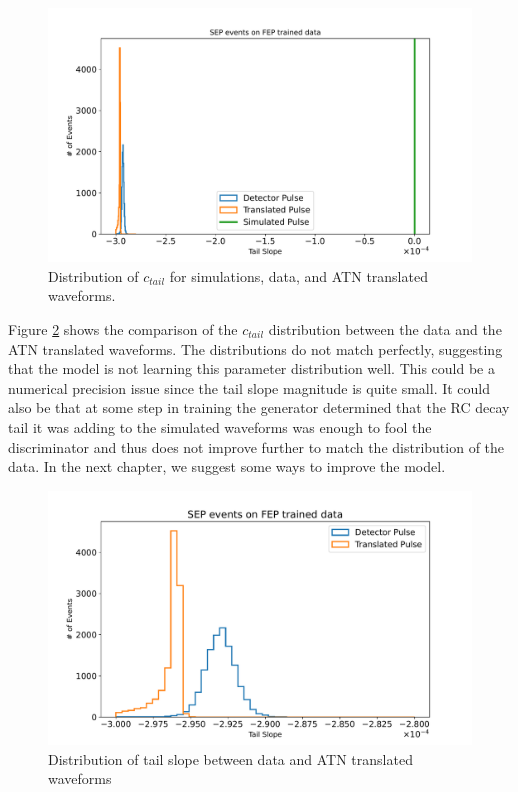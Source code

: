 \begin{figure}%
\centering
\includegraphics[width=0.9\linewidth,trim={2pc 0pc 2pc 0pc},clip]{ch8/figs/SEP_ts_with_sim.pdf}
\caption{Distribution of $c_{tail}$ for simulations, data, and ATN translated waveforms.}
\label{ch8_fig_tail_slope_comp}
\end{figure}

Figure \ref{ch8_fig_tail_slope_sim} shows the comparison of the $c_{tail}$ distribution between the data and the ATN translated waveforms. The distributions do not match perfectly, suggesting that the model is not learning this parameter distribution well. This could be a numerical precision issue since the tail slope magnitude is quite small. It could also be that at some step in training the generator determined that the RC decay tail it was adding to the simulated waveforms was enough to fool the discriminator and thus does not improve further to match the distribution of the data. In the next chapter, we suggest some ways to improve the model.

\begin{figure}%
\centering
\includegraphics[width=0.9\linewidth,trim={2pc 0pc 2pc 0pc},clip]{ch8/figs/SEP_ts.pdf}
\caption{Distribution of tail slope between data and ATN translated waveforms}
\label{ch8_fig_tail_slope_sim}
\end{figure}


